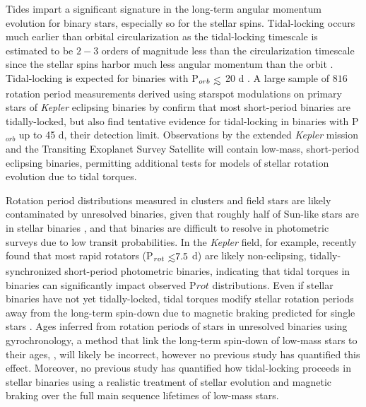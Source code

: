 \documentclass[twocolumn]{aastex61}
\def\lsim{~\rlap{$<$}{\lower 1.0ex\hbox{$\sim$}}}
\newcommand{\kepler}[0]{\textit{Kepler}\xspace}
\begin{document}
Tides impart a significant signature in the long-term angular momentum evolution for binary stars, especially so for the stellar spins. Tidal-locking occurs much earlier than orbital circularization as the tidal-locking timescale is estimated to be $2-3$ orders of magnitude less than the circularization timescale since the stellar spins harbor much less angular momentum than the orbit \citep{Zahn1989,Witte2002,Mazeh2008}. Tidal-locking is expected for binaries with P$_{orb} \lsim$ 20 d \citep[e.g.][]{Meibom2006,Mazeh2008,Zahn2008,Meibom2015}. A large sample of $816$ rotation period measurements derived using starspot modulations on primary stars of \kepler eclipsing binaries by \citet{Lurie2017} confirm that most short-period binaries are tidally-locked, but also find tentative evidence for tidal-locking in binaries with P$_{orb}$ up to 45 d, their detection limit. Observations by the extended \kepler mission \citep[K2,][]{Howell2014} and the Transiting Exoplanet Survey Satellite \citep[TESS, ][]{Ricker2014,Sullivan2015} will contain low-mass, short-period eclipsing binaries, permitting additional tests for models of stellar rotation evolution due to tidal torques.
 
Rotation period distributions measured in clusters and field stars are likely contaminated by unresolved binaries, given that roughly half of Sun-like stars are in stellar binaries \citep{Raghavan2010,Duchene2013}, and that binaries are difficult to resolve in photometric surveys due to low transit probabilities. In the \kepler field, for example, \citet{Simonian2018} recently found that most rapid rotators (P$_{rot} \lsim 7.5$ d) are likely non-eclipsing, tidally-synchronized short-period photometric binaries, indicating that tidal torques in binaries can significantly impact observed P${rot}$ distributions.  Even if stellar binaries have not yet tidally-locked, tidal torques modify stellar rotation periods away from the long-term spin-down due to magnetic braking predicted for single stars \citep{Dunn1961,Skumanich1972,Barnes2003}. Ages inferred from rotation periods of stars in unresolved binaries using gyrochronology, a method that link the long-term spin-down of low-mass stars to their ages, \citep{Skumanich1972,Barnes2003,Barnes2007,Mamajek2008,Barnes2010}, will likely be incorrect, however no previous study has quantified this effect.  Moreover, no previous study has quantified how tidal-locking proceeds in stellar binaries using a realistic treatment of stellar evolution and magnetic braking over the full main sequence lifetimes of low-mass stars.
\end{document}
